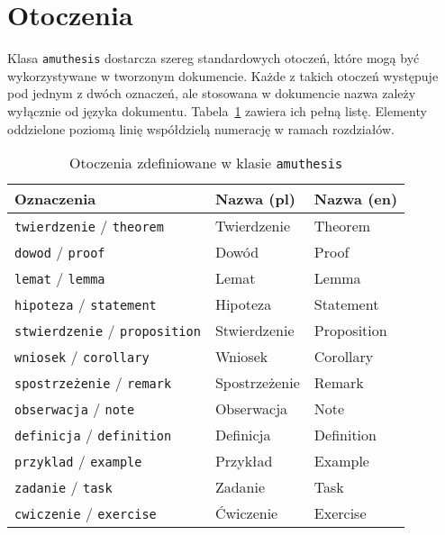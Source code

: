 \documentclass[oneside,polski]{amuthesis}
\begin{document}
\section{Otoczenia}

Klasa \texttt{amuthesis} dostarcza szereg standardowych otoczeń, które mogą być wykorzystywane w tworzonym dokumencie. Każde z takich otoczeń występuje pod jednym z dwóch oznaczeń, ale stosowana w dokumencie nazwa zależy wyłącznie od języka dokumentu. Tabela~\ref{table:amuthesis-otoczenia} zawiera ich pełną listę. Elementy oddzielone poziomą linię współdzielą numerację w ramach rozdziałów.

\begin{table}[p]
  \caption{Otoczenia zdefiniowane w klasie \texttt{amuthesis}}
  \label{table:amuthesis-otoczenia}
  \begin{center}
  \begin{tabular}{lll}
    \toprule
    Oznaczenia & Nazwa (pl) & Nazwa (en)\\
    \midrule
    \texttt{twierdzenie} / \texttt{theorem} & Twierdzenie & Theorem\\
    \texttt{dowod} / \texttt{proof} & Dowód & Proof\\
    \texttt{lemat} / \texttt{lemma} & Lemat & Lemma\\
    \texttt{hipoteza} / \texttt{statement} & Hipoteza & Statement\\
    \texttt{stwierdzenie} / \texttt{proposition} & Stwierdzenie & Proposition\\
    \texttt{wniosek} / \texttt{corollary} & Wniosek & Corollary\\
    \texttt{spostrzeżenie} / \texttt{remark} & Spostrzeżenie & Remark\\
    \texttt{obserwacja} / \texttt{note} & Obserwacja & Note\\
    \midrule
    \texttt{definicja} / \texttt{definition} & Definicja & Definition\\
    \midrule
    \texttt{przyklad} / \texttt{example} & Przykład & Example\\
    \midrule
    \texttt{zadanie} / \texttt{task} & Zadanie & Task\\
    \texttt{cwiczenie} / \texttt{exercise} & Ćwiczenie & Exercise\\
    \bottomrule
  \end{tabular}
  \end{center}
\end{table}
\end{document}
